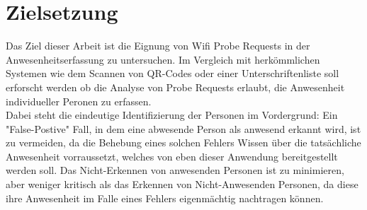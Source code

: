 \section{Zielsetzung}
\label{goal}

Das Ziel dieser Arbeit ist die Eignung von Wifi Probe Requests in der Anwesenheitserfassung zu untersuchen.
Im Vergleich mit herkömmlichen Systemen wie dem Scannen von QR-Codes oder einer Unterschriftenliste soll erforscht werden ob die Analyse von Probe Requests erlaubt, die Anwesenheit individueller Peronen zu erfassen.
\\

Dabei steht die eindeutige Identifizierung der Personen im Vordergrund:
Ein "False-Postive" Fall, in dem eine abwesende Person als anwesend erkannt wird, ist zu vermeiden, da die Behebung eines solchen Fehlers Wissen über die tatsächliche Anwesenheit vorraussetzt, welches von eben dieser Anwendung bereitgestellt werden soll.
Das Nicht-Erkennen von anwesenden Personen ist zu minimieren, aber weniger kritisch als das Erkennen von Nicht-Anwesenden Personen, da diese ihre Anwesenheit im Falle eines Fehlers eigenmächtig nachtragen können.
